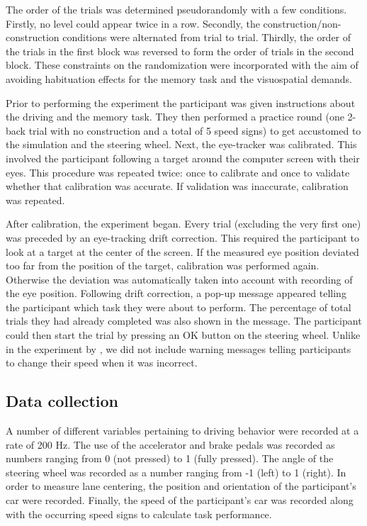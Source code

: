 The order of the trials was determined pseudorandomly with a few conditions. 
Firstly, no \nback level could appear twice in a row. 
Secondly, the construction/non-construction conditions were alternated from trial to trial. 
Thirdly, the order of the trials in the first block was reversed to form the order of trials in the second block.
These constraints on the randomization were incorporated with the aim of avoiding habituation effects for the memory task and the visuospatial demands.

Prior to performing the experiment the participant was given instructions about the driving and the memory task. 
They then performed a practice round (one 2-back trial with no construction and a total of 5 speed signs) to get accustomed to the simulation and the steering wheel. 
Next, the eye-tracker was calibrated. 
This involved the participant following a target around the computer screen with their eyes. 
This procedure was repeated twice: once to calibrate and once to validate whether that calibration was accurate. 
If validation was inaccurate, calibration was repeated.

After calibration, the experiment began. 
Every trial (excluding the very first one) was preceded by an eye-tracking drift correction. 
This required the participant to look at a target at the center of the screen. 
If the measured eye position deviated too far from the position of the target, calibration was performed again. 
Otherwise the deviation was automatically taken into account with recording of the eye position.
Following drift correction, a pop-up message appeared telling the participant which \nback task they were about to perform.
The percentage of total trials they had already completed was also shown in the message. 
The participant could then start the trial by pressing an OK button on the steering wheel.
Unlike in the experiment by \citeauthor{Scheunemann2019}, we did not include warning messages telling participants to change their speed when it was incorrect.

\subsection{Data collection}
A number of different variables pertaining to driving behavior were recorded at a rate of 200 Hz. 
The use of the accelerator and brake pedals was recorded as numbers ranging from 0 (not pressed) to 1 (fully pressed). 
The angle of the steering wheel was recorded as a number ranging from -1 (left) to 1 (right).
In order to measure lane centering, the position and orientation of the participant's car were recorded. 
Finally, the speed of the participant's car was recorded along with the occurring speed signs to calculate \nback task performance. 

